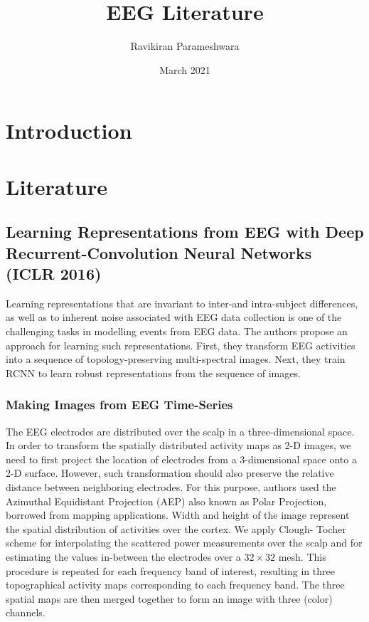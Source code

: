 \documentclass{article}
\title{EEG Literature}
\author{Ravikiran Parameshwara}
\date{March 2021}
\begin{document}
\maketitle

\section{Introduction}
\section{Literature}
\subsection{Learning Representations from EEG with Deep Recurrent-Convolution Neural Networks (ICLR 2016) \cite{bashivan2015learning}}
Learning representations that are invariant to inter-and intra-subject differences, as well as to inherent noise associated with EEG data collection is one of the challenging tasks in modelling events from EEG data. The authors propose an approach for learning such representations. First, they transform EEG activities into a sequence of topology-preserving multi-spectral images. Next, they train RCNN to learn robust representations from the sequence of images.


\subsubsection{Making Images from EEG Time-Series}
The EEG electrodes are distributed over the scalp in a three-dimensional space. In order to transform the spatially distributed activity maps as 2-D images, we need to first project the location of electrodes from a 3-dimensional space onto a 2-D surface. However, such transformation should also preserve the relative distance between neighboring electrodes. For this purpose, authors used the Azimuthal Equidistant Projection (AEP) also known as Polar Projection, borrowed from mapping applications. Width and height of the image represent the spatial distribution of activities over the cortex. We apply Clough- Tocher scheme for interpolating the scattered power measurements over the scalp and for estimating the values in-between the electrodes over a $32\times32$ mesh. This procedure is repeated for each frequency band of interest, resulting in three topographical activity maps corresponding to each frequency band. The three spatial maps are then merged together to form an image with three (color) channels.
\end{document}
